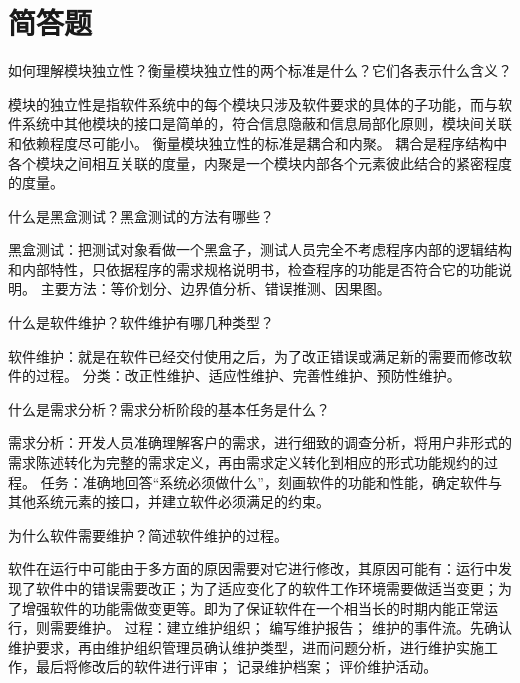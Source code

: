 \documentclass[answers]{exam}
\begin{document}
\section{简答题}
\begin{questions}
	\question 如何理解模块独立性？衡量模块独立性的两个标准是什么？它们各表示什么含义？
	\begin{solution}
		模块的独立性是指软件系统中的每个模块只涉及软件要求的具体的子功能，而与软件系统中其他模块的接口是简单的，符合信息隐蔽和信息局部化原则，模块间关联和依赖程度尽可能小。 衡量模块独立性的标准是耦合和内聚。 耦合是程序结构中各个模块之间相互关联的度量，内聚是一个模块内部各个元素彼此结合的紧密程度的度量。
	\end{solution}
	\question 什么是黑盒测试？黑盒测试的方法有哪些？
	\begin{solution}
		黑盒测试：把测试对象看做一个黑盒子，测试人员完全不考虑程序内部的逻辑结构和内部特性，只依据程序的需求规格说明书，检查程序的功能是否符合它的功能说明。 主要方法：等价划分、边界值分析、错误推测、因果图。
	\end{solution}
	\question 什么是软件维护？软件维护有哪几种类型？
	\begin{solution}
		软件维护：就是在软件已经交付使用之后，为了改正错误或满足新的需要而修改软件的过程。 分类：改正性维护、适应性维护、完善性维护、预防性维护。
	\end{solution}
	\question 什么是需求分析？需求分析阶段的基本任务是什么？
	\begin{solution}
		需求分析：开发人员准确理解客户的需求，进行细致的调查分析，将用户非形式的需求陈述转化为完整的需求定义，再由需求定义转化到相应的形式功能规约的过程。 任务：准确地回答``系统必须做什么''，刻画软件的功能和性能，确定软件与其他系统元素的接口，并建立软件必须满足的约束。
	\end{solution}
	\question 为什么软件需要维护？简述软件维护的过程。
	\begin{solution}
		软件在运行中可能由于多方面的原因需要对它进行修改，其原因可能有：运行中发现了软件中的错误需要改正；为了适应变化了的软件工作环境需要做适当变更；为了增强软件的功能需做变更等。即为了保证软件在一个相当长的时期内能正常运行，则需要维护。 过程：建立维护组织； 编写维护报告； 维护的事件流。先确认维护要求，再由维护组织管理员确认维护类型，进而问题分析，进行维护实施工作，最后将修改后的软件进行评审； 记录维护档案； 评价维护活动。
	\end{solution}
\end{questions}
\end{document}
